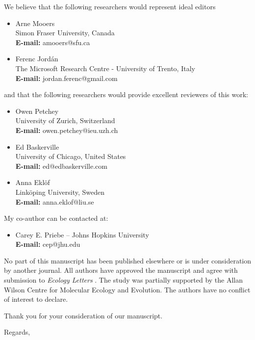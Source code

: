 \documentclass[12pt]{letter}
\newcommand{\myjournal}{\emph{Ecology Letters }}
\begin{document}
\begin{letter}
We believe that the following researchers would represent ideal editors

\begin{itemize}
  \item Arne Mooers\\
	Simon Fraser University, Canada \\
	\textbf{E-mail:} amooers@sfu.ca
  \item Ferenc Jord\'{a}n\\
	The Microsoft Research Centre - University of Trento, Italy \\
	\textbf{E-mail:} jordan.ferenc@gmail.com
\end{itemize}

and that the following researchers would provide excellent reviewers of this work:

\begin{itemize}
  \item Owen Petchey\\
	University of Zurich, Switzerland\\
	\textbf{E-mail:} owen.petchey@ieu.uzh.ch
  \item Ed Baskerville\\
	University of Chicago, United States\\
	\textbf{E-mail:} ed@edbaskerville.com
  \item Anna Ekl\"{o}f\\
	Link\"{o}ping University, Sweden\\
	\textbf{E-mail:} anna.eklof@liu.se
\end{itemize}

My co-author can be contacted at:

\begin{itemize}
  \item Carey E. Priebe -- Johns Hopkins University \\
	\textbf{E-mail:} cep@jhu.edu
\end{itemize}

No part of this manuscript has been published elsewhere or is under consideration by
another journal. All authors have approved the manuscript and agree with submission to
\myjournal. The study was partially supported by the Allan Wilson Centre for Molecular Ecology
and Evolution. The authors have no conflict of interest to declare.


Thank you for your consideration of our manuscript.

\closing{Regards,}

\end{letter}
\end{document}
